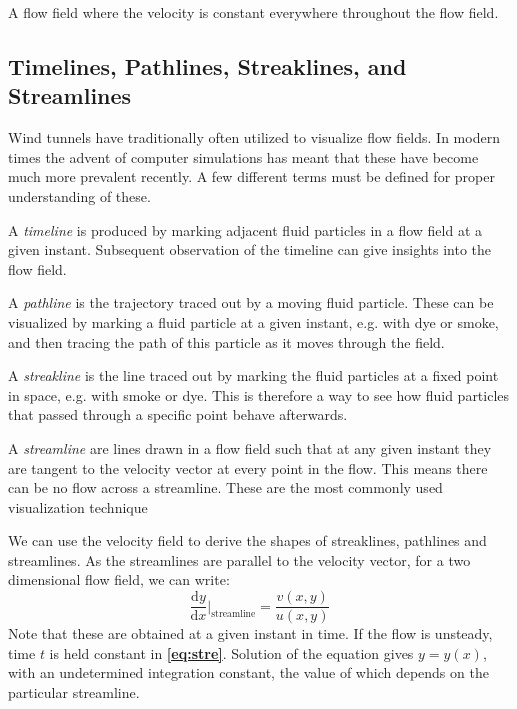\begin{definition}
  A flow field where the velocity is constant everywhere throughout the flow field.
\end{definition}


\subsection{Timelines, Pathlines, Streaklines, and Streamlines}
Wind tunnels have traditionally often utilized to visualize flow fields. In modern times the advent of computer simulations has meant that these have become much more prevalent recently. A few different terms must be defined for proper understanding of these.

\begin{definition}[Timeline]
  A \textit{timeline} is produced by marking adjacent fluid particles in a flow field at a given instant. Subsequent observation of the timeline can give insights into the flow field.
\end{definition}

\begin{definition}[Pathline]
  A \textit{pathline} is the trajectory traced out by a moving fluid particle. These can be visualized by marking a fluid particle at a given instant, e.g. with dye or smoke, and then tracing the path of this particle as it moves through the field.
\end{definition}

\begin{definition}[Streakline]
  A \textit{streakline} is the line traced out by marking the fluid particles at a fixed point in space, e.g. with smoke or dye. This is therefore a way to see how fluid particles that passed through a specific point behave afterwards.
\end{definition}

\begin{definition}[Streamlines]
  A \textit{streamline} are lines drawn in a flow field such that at any given instant they are tangent to the velocity vector at every point in the flow. This means there can be no flow across a streamline. These are the most commonly used visualization technique
\end{definition}

We can use the velocity field to derive the shapes of streaklines, pathlines and streamlines. As the streamlines are parallel to the velocity vector, for a two dimensional flow field, we can write:
\begin{equation} \label{eq:stre}
  \frac{\mathrm{d}y}{\mathrm{d}x} \bigg|_{\text{streamline}} = \frac{v(x,y)}{u(x,y)}
\end{equation}
Note that these are obtained at a given instant in time. If the flow is unsteady, time $t$ is held constant in \textbf{\autoref{eq:stre}}. Solution of the equation gives $y = y(x)$, with an undetermined integration constant, the value of which depends on the particular streamline.

